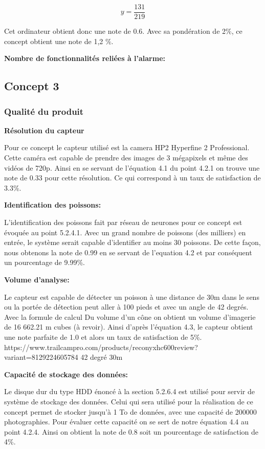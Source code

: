 \begin{equation}
    y = \frac{131}{219}
\end{equation}

Cet ordinateur obtient donc une note de 0.6. Avec sa pondération de 2\%, ce concept obtient une note de 1,2 \%.

\textbf{Nombre de fonctionnalités reliées à l'alarme:}


\subsection{Concept 3}

\subsubsection{Qualité du produit}

\textbf{Résolution du capteur}

     Pour ce concept le capteur utilisé est la camera HP2 Hyperfine 2 Professional. Cette caméra est capable de prendre des images de 3 mégapixels et même des vidéos de 720p. Ainsi en se servant de l’équation 4.1 du point 4.2.1 on trouve une note de 0.33 pour cette résolution. Ce qui correspond à un taux de satisfaction de 3.3\%.

\textbf{Identification des poissons:}

L’identification des poissons fait par réseau de neurones pour ce concept est évoquée au point 5.2.4.1. Avec un grand nombre de poissons (des milliers) en entrée, le système serait capable d’identifier au moins 30 poissons. De cette façon, nous obtenons la note de 0.99 en se servant de l’equation 4.2 et par conséquent un pourcentage de 9.99\%.

\textbf{Volume d’analyse:}

Le capteur est capable de détecter un poisson à une distance de 30m dans le sens ou  la portée de détection peut aller à 100 pieds  et avec un angle de 42 degrés. Avec la formule de calcul Du volume d’un cône on obtient un volume d’imagerie de 16 662.21 m cubes (à revoir). Ainsi d’après l’équation 4.3, le capteur obtient une note parfaite de 1.0 et alors un taux de satisfaction de 5\%.
https://www.trailcampro.com/products/reconyxhc600review?variant=8129224605784 42 degré 30m

\textbf{Capacité de stockage des données:}

  Le disque dur du type HDD énoncé à la section 5.2.6.4 est utilisé pour servir de système de stockage des données. Celui qui sera utilisé pour la réalisation de ce concept permet de stocker jusqu’à 1 To de données, avec une capacité de 200000 photographies. Pour évaluer cette capacité on se sert de notre équation 4.4 au point 4.2.4. Ainsi on obtient la note de 0.8 soit un pourcentage de satisfaction de 4\%.
  

